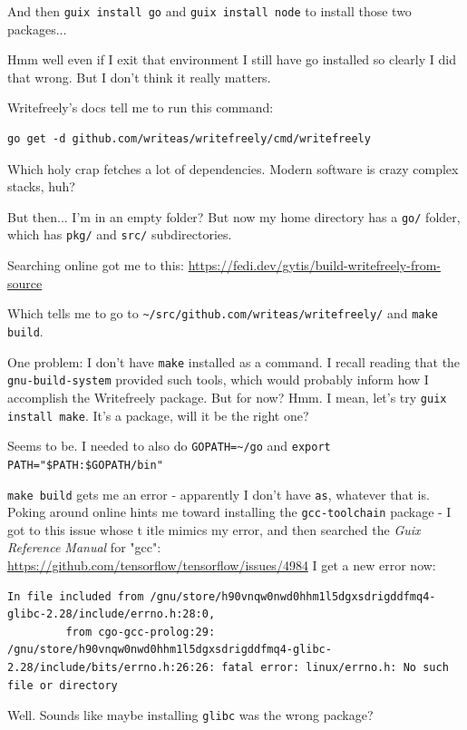 \documentclass[11pt]{article}
\begin{document}
And then \texttt{guix install go} and \texttt{guix install node} to install those
two packages...

Hmm well even if I exit that environment I still have go installed so
clearly I did that wrong. But I don't think it really matters.

Writefreely's docs tell me to run this command:

\begin{verbatim}
go get -d github.com/writeas/writefreely/cmd/writefreely
\end{verbatim}

Which holy crap fetches a lot of dependencies. Modern software is
crazy complex stacks, huh?

But then... I'm in an empty folder? But now my home directory has a
\texttt{go/} folder, which has \texttt{pkg/} and \texttt{src/} subdirectories.

Searching online got me to this:
\url{https://fedi.dev/gytis/build-writefreely-from-source}

Which tells me to go to \texttt{\textasciitilde{}/src/github.com/writeas/writefreely/} and \texttt{make
build}.

One problem: I don't have \texttt{make} installed as a command. I recall
reading that the \texttt{gnu-build-system} provided such tools, which would
probably inform how I accomplish the Writefreely package. But for now?
Hmm. I mean, let's try \texttt{guix install make}. It's a package, will it be
the right one?

Seems to be. I needed to also do \texttt{GOPATH=\textasciitilde{}/go} and \texttt{export
PATH="\$PATH:\$GOPATH/bin"}

\texttt{make build} gets me an error - apparently I don't have \texttt{as}, whatever
that is. Poking around online hints me toward installing the
\texttt{gcc-toolchain} package - I got to this issue whose t
itle mimics my
error, and then searched the \emph{Guix Reference Manual} for "gcc":
\url{https://github.com/tensorflow/tensorflow/issues/4984}
I get a new error now:

\begin{verbatim}
In file included from /gnu/store/h90vnqw0nwd0hhm1l5dgxsdrigddfmq4-glibc-2.28/include/errno.h:28:0,
		 from cgo-gcc-prolog:29:
/gnu/store/h90vnqw0nwd0hhm1l5dgxsdrigddfmq4-glibc-2.28/include/bits/errno.h:26:26: fatal error: linux/errno.h: No such file or directory
\end{verbatim}

Well. Sounds like maybe installing \texttt{glibc} was the wrong package?
\end{document}
